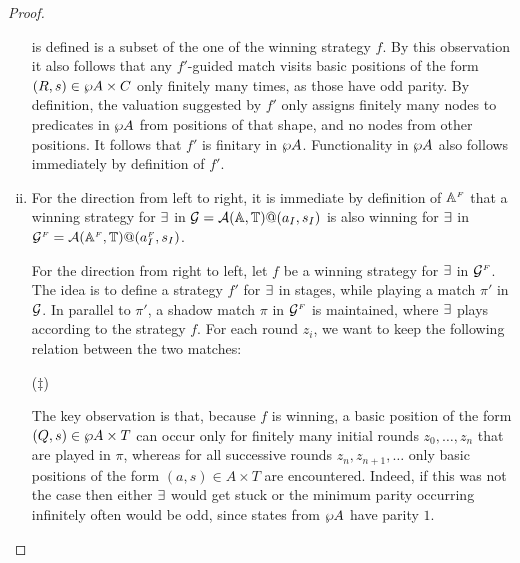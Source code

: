 \begin{proof}
\begin{enumerate}[(i)]
is defined is a subset of the one of the winning strategy $f$.
By this observation it also follows that any $f'$-guided match visits basic
positions of the form $(R,s) \in \wp A \times C$ only finitely many times, as
those have odd parity.
By definition, the valuation suggested by $f'$ only assigns finitely many nodes
to predicates in $\wp A$ from positions of that shape, and no nodes from other
positions. It follows that $f'$ is finitary in $\wp A$. Functionality in $\wp A$ also follows immediately by definition of $f'$.
  \item For the direction from left to right, it is immediate by definition of $\mathbb{A}^{{\scriptscriptstyle F}}$ that a winning strategy for $\exists$ in $\mathcal{G} = \mathcal{A}(\mathbb{A},\mathbb{T})@(a_I,s_I)$ is also winning for $\exists$ in $\mathcal{G}^{{\scriptscriptstyle F}} = \mathcal{A}(\mathbb{A}^{{\scriptscriptstyle F}},\mathbb{T})@(a_I^{{\scriptscriptstyle F}},s_I)$.

      For the direction from right to left, let $f$ be a winning strategy for $\exists$ in $\mathcal{G}^{{\scriptscriptstyle F}}$. The idea is to define a strategy $f'$ for $\exists$ in stages, while playing a match $\pi'$ in $\mathcal{G}$. In parallel to $\pi'$, a shadow match $\pi$ in $\mathcal{G}^{{\scriptscriptstyle F}}$ is maintained, where $\exists$ plays according to the strategy $f$. For each round $z_i$, we want to keep the following relation between the two matches:
\smallskip
\begin{center}
\hspace*{0.3cm}($\ddag$)
\end{center}
\smallskip
The key observation is that, because $f$ is winning, a basic position of the form $(Q,s) \in \wp A \times T$ can occur only for finitely many initial rounds $z_0,\dots,z_n$ that are played in $\pi$, whereas for all successive rounds $z_n,z_{n+1},\dots$ only basic positions of the form $(a,s) \in A \times T$ are encountered. Indeed, if this was not the case then either $\exists$ would get stuck or the minimum parity occurring infinitely often would be odd, since states from $\wp A$ have parity $1$.


\end{enumerate}
\end{proof}
